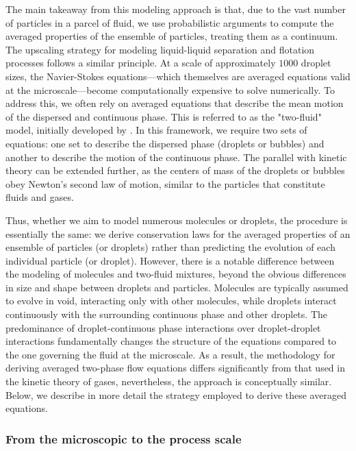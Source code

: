 The main takeaway from this modeling approach is that, due to the vast number of particles in a parcel of fluid, we use probabilistic arguments to compute the averaged properties of the ensemble of particles, treating them as a continuum.
The upscaling strategy for modeling liquid-liquid separation and flotation processes follows a similar principle.
At a scale of approximately $1000$ droplet sizes, the Navier-Stokes equations—which themselves are averaged equations valid at the microscale—become computationally expensive to solve numerically.
To address this, we often rely on averaged equations that describe the mean motion of the dispersed and continuous phase.
This is referred to as the "two-fluid" model, initially developed by \citet{drew1983mathematical}.
In this framework, we require two sets of equations: one set to describe the dispersed phase (droplets or bubbles) and another to describe the motion of the continuous phase.
The parallel with kinetic theory can be extended further, as the centers of mass of the droplets or bubbles obey Newton's second law of motion, similar to the particles that constitute fluids and gases.


Thus, whether we aim to model numerous molecules or droplets, the procedure is essentially the same: we derive conservation laws for the averaged properties of an ensemble of particles (or droplets) rather than predicting the evolution of each individual particle (or droplet).
However, there is a notable difference between the modeling of molecules and two-fluid mixtures, beyond the obvious differences in size and shape between droplets and particles.
Molecules are typically assumed to evolve in void, interacting only with other molecules, while droplets interact continuously with the surrounding continuous phase and other droplets.
The predominance of droplet-continuous phase interactions over droplet-droplet interactions fundamentally changes the structure of the equations compared to the one governing the fluid at the microscale.
As a result, the methodology for deriving averaged two-phase flow equations differs significantly from that used in the kinetic theory of gases, nevertheless, the approach is conceptually similar.
Below, we describe in more detail the strategy employed to derive these averaged equations. 


\subsubsection{From the microscopic to the process scale}

